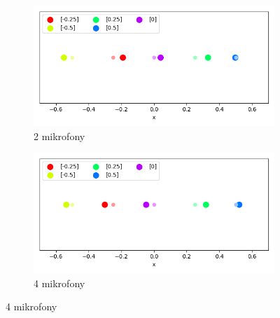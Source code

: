 \begin{frame}{}
    \begin{figure}
        \centering
        \begin{subfigure}{}
            \centering
            \includegraphics[width=0.6\linewidth]{../pics/mult_lat_1d/positions_2_mean.png}
            \caption{2 mikrofony}
        \end{subfigure}%
        \begin{subfigure}{}
            \centering
            \includegraphics[width=0.6\linewidth]{../pics/mult_lat_1d/positions_4_mean.png}
            \caption{4 mikrofony}
        \end{subfigure}
    \end{figure}
\end{frame}